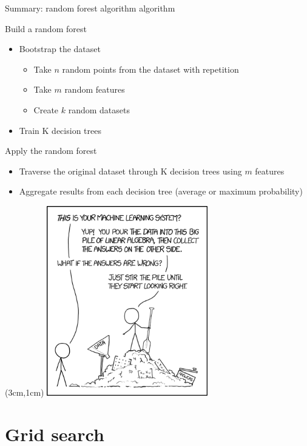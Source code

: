 \documentclass[handout, 10pt]{beamer}
\begin{document}
\begin{frame}{Summary: random forest algorithm algorithm}
\begin{block}{Build a random forest}
\begin{itemize}
    \item Bootstrap the dataset
    \begin{itemize}
        \item Take $n$ random points from the dataset with repetition
        \item Take $m$ random features
        \item Create $k$ random datasets
    \end{itemize}
    \item Train K decision trees
\end{itemize}
\end{block}
\begin{block}{Apply the random forest}
\begin{itemize}
    \item Traverse the original dataset through K decision trees using $m$ features
    \item Aggregate results from each decision tree (average or maximum probability)
\end{itemize}
\end{block}
\begin{textblock*}{8cm}(3cm,1cm) %
\includegraphics[width=7cm]{figs/machine_learning.png}
\end{textblock*}
\end{frame}

\section{Grid search}
\end{document}
